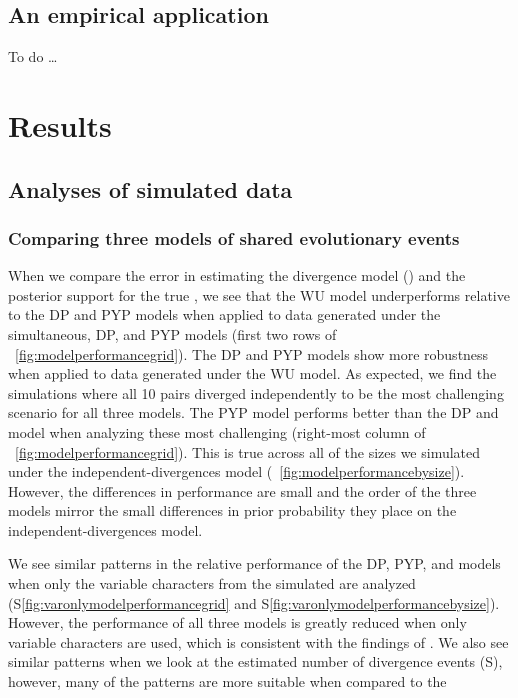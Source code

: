 \documentclass[letterpaper,12pt]{article}
\begin{document}
\subsection{An empirical application}

To do \ldots

\section{Results}

\subsection{Analyses of simulated data}

\subsubsection{Comparing three models of shared evolutionary events}

When we compare the error in estimating the divergence model (\etimesets) and
the posterior support for the true \etimesets, we see that the WU model
underperforms relative to the DP and PYP models when applied to data generated
under the simultaneous, DP, and PYP models
(first two rows of \fig~\ref{fig:modelperformancegrid}).
The DP and PYP models show more robustness when applied to
data generated under the WU model.
As expected, we find the simulations where all 10 pairs diverged independently
to be the most challenging scenario for all three models.
The PYP model performs better than the DP and \wunif model
when analyzing these most challenging \datasets
(right-most column of \fig~\ref{fig:modelperformancegrid}).
This is true across all of the \dataset sizes we simulated
under the independent-divergences model
(\fig~\ref{fig:modelperformancebysize}).
However, the differences in performance are small and the order of the three
models mirror the small differences in prior probability they place on the
independent-divergences model.

We see similar patterns in the relative performance of the DP, PYP, and
\wunif models when only the variable characters from the simulated
\datasets are analyzed
(\figs S\ref{fig:varonlymodelperformancegrid}
and S\ref{fig:varonlymodelperformancebysize}).
However, the performance of all three models is greatly reduced when
only variable characters are used,
which is consistent with the findings of
\citet{Oaks2018ecoevolity,Oaks2018paic,Oaks2019codemog}.
We also see similar patterns when we look at the estimated
number of divergence events
(\figs S), however, many of the patterns are more
suitable when compared to the 
\end{document}
